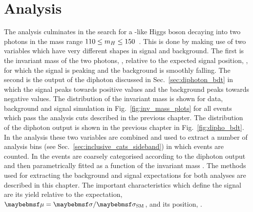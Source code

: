 \chapter{Analysis}
\label{chap:analysis}

The analysis culminates in the search for a \SM-like Higgs boson decaying into two photons in the mass range $110\leq m_{H}\leq 150$~\GeV. This is done by making use of two variables which have very different shapes in signal and background. The first is the invariant mass of the two photons, \mgg, relative to the expected signal position, \mH, for which the signal is peaking and the background is smoothly falling. The second is the output of the diphoton \BDT discussed in Sec.~\ref{sec:diphoton_bdt} in which the signal peaks towards positive values and the background peaks towards negative values. The distribution of the invariant mass is shown for data, background and signal \MC simulation in Fig.~\ref{fig:inv_mass_plots} for all events which pass the \MFM analysis cuts described in the previous chapter. The distribution of the diphoton \BDT output is shown in the previous chapter in Fig.~\ref{fig:dipho_bdt}. In the \SMVA analysis these two variables are combined and used to extract a number of analysis bins (see Sec.~\ref{sec:inclusive_cats_sideband}) in which events are counted. In the \MFM events are coarsely categorised according to the diphoton \BDT output and then parametrically fitted as a function of the invariant mass \mgg. The methods used for extracting the background and signal expectations for both analyses are described in this chapter. The important characteristics which define the signal are its yield relative to the \SM expectation, $\mu=\musm$, and its position, \mH.

